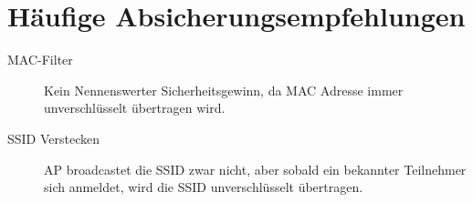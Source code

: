\documentclass{beamer}
\begin{document}
\section{Häufige Absicherungsempfehlungen}
\begin{frame}
\begin{description}
	\item[MAC-Filter] Kein Nennenswerter Sicherheitsgewinn, da MAC Adresse immer unverschlüsselt übertragen wird.
	\item[SSID Verstecken] AP broadcastet die SSID zwar nicht, aber sobald ein bekannter Teilnehmer sich anmeldet, wird die SSID unverschlüsselt übertragen.
\end{description}
\end{frame}
\end{document}
